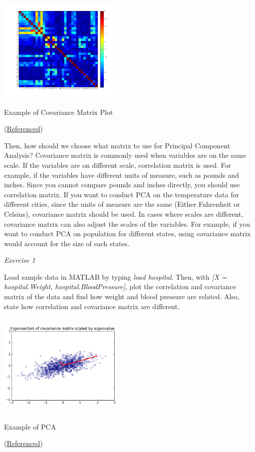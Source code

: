 \documentclass{tufte-handout}
\begin{document}
\begin{marginfigure}
    \centering
    \includegraphics[width = 6cm, height = 5cm]{cov.png}
    \label{fig:cov}
\caption{Example of Covariance Matrix Plot}
(\href{https://www.mathworks.com/matlabcentral/answers/196574-factor-analysis-a-covariance-matrix-is-not-positive-definite}{Referenced})

\end{marginfigure}

Then, how should we choose what matrix to use for Principal Component Analysis? Covariance matrix is commonly used when variables are on the same scale. If the variables are on different scale, correlation matrix is used. For example, if the variables have different units of measure, such as pounds and inches. Since you cannot compare pounds and inches directly, you should use correlation matrix. If you want to conduct PCA on the temperature data for different cities, since the units of measure are the same (Either Fahrenheit or Celsius), covariance matrix should be used. In cases where scales are different, covariance matrix can also adjust the scales of the variables. For example, if you want to conduct PCA on population for different states, using covariance matrix would account for the size of each states.

\textit{Exercise 1}

Load sample data in MATLAB by typing \textit{load hospital}. Then, with \textit{[X = hospital.Weight, hospital.BloodPressure]}, plot the correlation and covariance matrix of the data and find how weight and blood pressure are related. Also, state how correlation and covariance matrix are different.

\begin{marginfigure}
    \centering
    \includegraphics[width = 6cm, height = 5cm]{PCA.png}
    \label{fig:PCA}
\caption{Example of PCA}
(\href{https://people.duke.edu/~ccc14/sta-663/PCASolutions.html}{Referenced})

\end{marginfigure}
\end{document}
